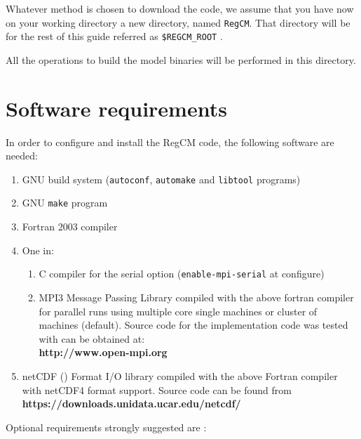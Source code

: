 %
%

Whatever method is chosen to download the code, we assume that you have now
on your working directory a new directory, named \verb=RegCM=.
That directory will be for the rest of this guide referred as 
\verb=$REGCM_ROOT= .

All the operations to build the model binaries will be performed in this
directory.

\section{Software requirements}

In order to configure and install the RegCM code, the following software are
needed:

\begin{enumerate}
    \item GNU build system (\verb=autoconf=, \verb=automake= and
        \verb=libtool= programs)
    \item GNU \verb=make= program
    \item Fortran 2003 compiler
    \item One in:
  \begin{enumerate}
    \item C compiler for the serial option (\verb=enable-mpi-serial= at
      configure)
    \item MPI3 Message Passing Library compiled with the above fortran compiler
     for parallel runs using multiple core single machines or cluster of
     machines (default).  Source code for the implementation code was tested
     with can be obtained at: \\
     {\bf http://www.open-mpi.org}
  \end{enumerate}
\item netCDF (\cite{Rew_90}) Format I/O library compiled with the above
  Fortran compiler with netCDF4 format support. Source code can be found from \\
  {\bf https://downloads.unidata.ucar.edu/netcdf/} \\
\end{enumerate}

Optional requirements strongly suggested are :

